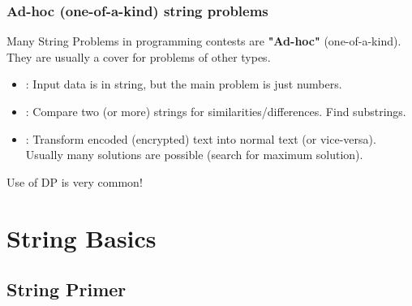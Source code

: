 \documentclass{beamer}
\begin{document}
\begin{frame}
  \frametitle{Ad-hoc (one-of-a-kind) string problems}
  Many String Problems in programming contests are {\bf "Ad-hoc"} (one-of-a-kind).
  They are usually a cover for problems of other types.

  \begin{exampleblock}{}
    \begin{itemize}
    \item {}: Input data is in string, but
      the main problem is just numbers.\bigskip

    \item {}: Compare two (or more) strings for
      similarities/differences. Find substrings.\bigskip

    \item {}: Transform encoded (encrypted)
      text into normal text (or vice-versa). Usually many solutions are
      possible (search for maximum solution).
    \end{itemize}
  \end{exampleblock}

  \bigskip

  Use of DP is very common!
\end{frame}

\section{String Basics}

\subsection{String Primer}
\end{document}
